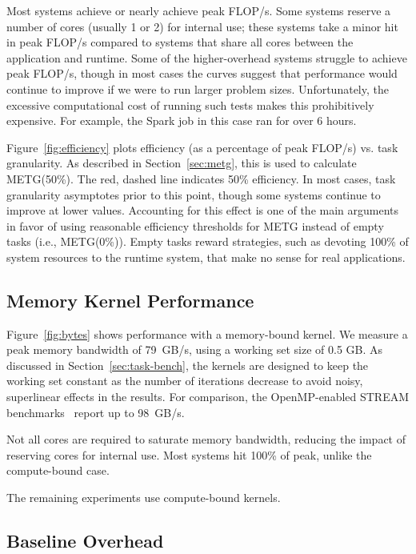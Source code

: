 Most systems achieve or nearly achieve peak FLOP/s. Some
systems reserve a number of cores (usually 1 or 2) for internal
use; these systems take a minor hit in peak FLOP/s compared
to systems that share all cores between the application and runtime. Some of the
higher-overhead systems struggle to achieve peak FLOP/s, though in most cases
the curves suggest that performance would continue to improve if we
were to run larger problem sizes. Unfortunately, the excessive
computational cost of running such tests makes this prohibitively
expensive. For example, the Spark job in
this case ran for over 6 hours.

Figure~\ref{fig:efficiency} plots efficiency (as a percentage of
peak FLOP/s) vs. task granularity. As described in Section~\ref{sec:metg}, this is
used to calculate METG(50\%). The
red, dashed line indicates 50\% efficiency.
In most cases, task granularity asymptotes prior to this point,
though some systems continue to improve at lower values. Accounting for this effect is one of the main arguments in
favor of using reasonable efficiency thresholds for METG instead of
empty tasks
(i.e., METG(0\%)). Empty tasks
reward strategies, such as devoting 100\% of
system resources to the runtime system, that make no sense for real
applications.

\subsection{Memory Kernel Performance}

Figure~\ref{fig:bytes} shows performance with a memory-bound kernel. We measure a peak memory
bandwidth of 79~GB/s, using a working set size of 0.5 GB. As discussed in Section~\ref{sec:task-bench}, the kernels are designed to keep the working set constant as the number of iterations decrease to avoid noisy, superlinear effects in the results. For comparison, the
OpenMP-enabled STREAM benchmarks~\cite{STREAM} report up to 98~GB/s.

Not all cores are required to saturate memory bandwidth, reducing the
impact of reserving cores for internal use. Most systems hit 100\% of
peak, unlike the compute-bound case.

The remaining experiments use compute-bound kernels.


\subsection{Baseline Overhead}

